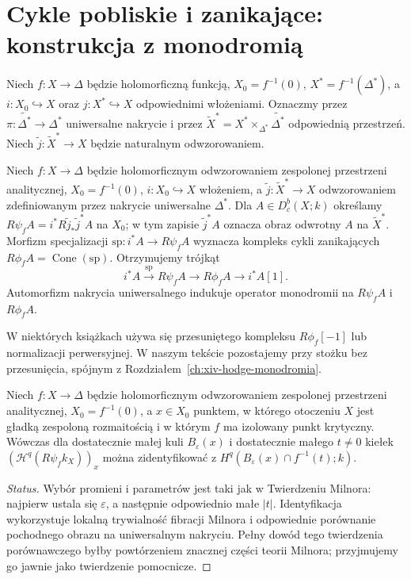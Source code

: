 \section{Cykle pobliskie i zanikające: konstrukcja z monodromią}
\label{sec:xvi-nearby}
Niech $f:X\to\Delta$ będzie holomorficzną funkcją,
$X_0=f^{-1}(0)$, $X^*=f^{-1}(\Delta^*)$, a
$i:X_0\hookrightarrow X$ oraz $j:X^*\hookrightarrow X$
odpowiednimi włożeniami. Oznaczmy przez
$\pi:\widetilde{\Delta^*}\to\Delta^*$ uniwersalne nakrycie
i przez $\widetilde X^*=X^*\times_{\Delta^*}
\widetilde{\Delta^*}$ odpowiednią przestrzeń. Niech
$\widetilde j:\widetilde X^*\to X$ będzie naturalnym odwzorowaniem.

\begin{definicja}
Niech $f:X\to\Delta$ będzie holomorficznym odwzorowaniem
zespolonej przestrzeni analitycznej, $X_0=f^{-1}(0)$,
$i:X_0\hookrightarrow X$ włożeniem, a
$\widetilde j:\widetilde X^*\to X$ odwzorowaniem
zdefiniowanym przez nakrycie uniwersalne $\Delta^*$.
Dla $A\in D^b_c(X;k)$ określamy
$R\psi_fA=i^*R\widetilde j_*\widetilde j^*A$
na $X_0$; w tym zapisie $\widetilde j^*A$ oznacza
obraz odwrotny $A$ na $\widetilde X^*$.
Morfizm specjalizacji $\mathrm{sp}:i^*A\to R\psi_fA$
wyznacza kompleks cykli zanikających
$R\phi_fA=\operatorname{Cone}(\mathrm{sp})$.
Otrzymujemy trójkąt
\[
 i^*A\xrightarrow{\mathrm{sp}}R\psi_fA
 \longrightarrow R\phi_fA\longrightarrow i^*A[1].
\]
Automorfizm nakrycia uniwersalnego indukuje operator monodromii
na $R\psi_fA$ i $R\phi_fA$.
\end{definicja}
\begin{uwaga}
W niektórych książkach używa się przesuniętego
kompleksu $R\phi_f[-1]$ lub normalizacji perwersyjnej.
W naszym tekście pozostajemy przy stożku bez przesunięcia,
spójnym z Rozdziałem~\ref{ch:xiv-hodge-monodromia}.
\end{uwaga}
\begin{stwierdzenie}
\label{prop:xvi-milnor-stalk}
Niech $f:X\to\Delta$ będzie holomorficznym
odwzorowaniem zespolonej przestrzeni analitycznej,
$X_0=f^{-1}(0)$, a $x\in X_0$ punktem, w którego
otoczeniu $X$ jest gładką zespoloną rozmaitością
i w którym $f$ ma izolowany punkt krytyczny.
Wówczas dla dostatecznie małej kuli
$B_\varepsilon(x)$ i dostatecznie małego $t\ne0$
kiełek $(\mathcal H^q(R\psi_fk_X))_x$ można zidentyfikować
z $H^q(B_\varepsilon(x)\cap f^{-1}(t);k)$.
\end{stwierdzenie}
\begin{proof}[Status]
Wybór promieni i parametrów jest taki jak w
Twierdzeniu Milnora: najpierw ustala się
$\varepsilon$, a następnie odpowiednio małe $|t|$.
Identyfikacja wykorzystuje lokalną trywialność
fibracji Milnora i odpowiednie porównanie
pochodnego obrazu na uniwersalnym nakryciu.
Pełny dowód tego twierdzenia porównawczego byłby
powtórzeniem znacznej części teorii Milnora;
przyjmujemy go jawnie jako twierdzenie pomocnicze.
\end{proof}
